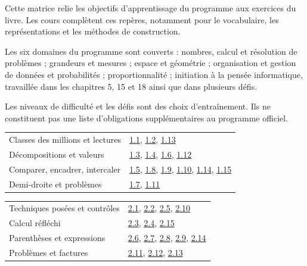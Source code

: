 \clearpage{}\label{couverture-programme}\gdef\otChapNum{0}\pagestyle{otFront}
Cette matrice relie les objectifs d’apprentissage du programme aux
exercices du livre. Les cours complètent ces repères, notamment pour
le vocabulaire, les représentations et les méthodes de construction.\par\bigskip
Les six domaines du programme sont couverts : nombres, calcul et
résolution de problèmes ; grandeurs et mesures ; espace et géométrie ;
organisation et gestion de données et probabilités ; proportionnalité ;
initiation à la pensée informatique, travaillée dans les chapitres 5,
15 et 18 ainsi que dans plusieurs défis.\par\bigskip
\begin{attention}Les niveaux de difficulté et les défis sont des choix
d’entraînement. Ils ne constituent pas une liste d’obligations
supplémentaires au programme officiel.\end{attention}\clearpage
{}\fontsize{10}{13}\selectfont
{}\begin{tabularx}{\linewidth}{@{}Yl@{}}\toprule
Classes des millions et lectures & \hyperref[exo-1-1]{1.1}, \hyperref[exo-1-2]{1.2}, \hyperref[exo-1-13]{1.13}\\[2mm]
Décompositions et valeurs & \hyperref[exo-1-3]{1.3}, \hyperref[exo-1-4]{1.4}, \hyperref[exo-1-6]{1.6}, \hyperref[exo-1-12]{1.12}\\[2mm]
Comparer, encadrer, intercaler & \hyperref[exo-1-5]{1.5}, \hyperref[exo-1-8]{1.8}, \hyperref[exo-1-9]{1.9}, \hyperref[exo-1-10]{1.10}, \hyperref[exo-1-14]{1.14}, \hyperref[exo-1-15]{1.15}\\[2mm]
Demi-droite et problèmes & \hyperref[exo-1-7]{1.7}, \hyperref[exo-1-11]{1.11}\\[2mm]
\bottomrule\end{tabularx}\par\vspace{4mm}
\begin{tabularx}{\linewidth}{@{}Yl@{}}\toprule
Techniques posées et contrôles & \hyperref[exo-2-1]{2.1}, \hyperref[exo-2-2]{2.2}, \hyperref[exo-2-5]{2.5}, \hyperref[exo-2-10]{2.10}\\[2mm]
Calcul réfléchi & \hyperref[exo-2-3]{2.3}, \hyperref[exo-2-4]{2.4}, \hyperref[exo-2-15]{2.15}\\[2mm]
Parenthèses et expressions & \hyperref[exo-2-6]{2.6}, \hyperref[exo-2-7]{2.7}, \hyperref[exo-2-8]{2.8}, \hyperref[exo-2-9]{2.9}, \hyperref[exo-2-14]{2.14}\\[2mm]
Problèmes et factures & \hyperref[exo-2-11]{2.11}, \hyperref[exo-2-12]{2.12}, \hyperref[exo-2-13]{2.13}\\[2mm]
\bottomrule\end{tabularx}\par\vspace{4mm}
